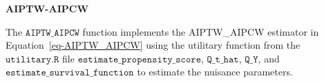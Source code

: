 \documentclass[
  11pt,
  a4paper,
]{article}
\newenvironment{Shaded}{}{}
\newcommand{\CommentTok}[1]{\textcolor[rgb]{0.42,0.45,0.49}{#1}}
\newcommand{\DecValTok}[1]{\textcolor[rgb]{0.00,0.36,0.77}{#1}}
\newcommand{\FunctionTok}[1]{\textcolor[rgb]{0.44,0.26,0.76}{#1}}
\newcommand{\NormalTok}[1]{\textcolor[rgb]{0.14,0.16,0.18}{#1}}
\newcommand{\OtherTok}[1]{\textcolor[rgb]{0.44,0.26,0.76}{#1}}
\newcommand{\SpecialCharTok}[1]{\textcolor[rgb]{0.00,0.36,0.77}{#1}}
\theoremstyle{plain}
\theoremstyle{plain}
\theoremstyle{plain}
\theoremstyle{definition}
\theoremstyle{remark}
\begin{document}
\begin{Shaded}
\end{Shaded}

\textbf{AIPTW-AIPCW}

The \(\texttt{AIPTW\_AIPCW}\) function implements the AIPTW\_AIPCW
estimator in Equation~\ref{eq-AIPTW_AIPCW} using the utilitary function
from the \(\texttt{utilitary.R}\) file
\(\texttt{estimate\_propensity\_score}\), \(\texttt{Q\_t\_hat}\),
\(\texttt{Q\_Y}\), and \(\texttt{estimate\_survival\_function}\) to
estimate the nuisance parameters.
\end{document}
